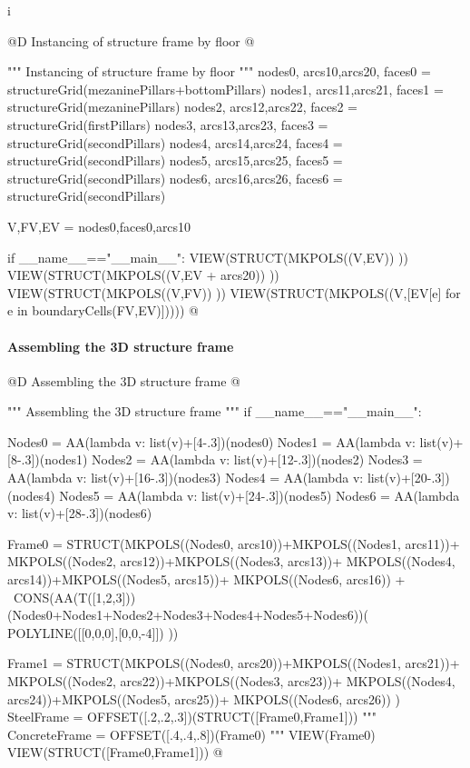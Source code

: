 i\documentclass[11pt,oneside]{article}    %
\begin{document}
@D Instancing of structure frame by floor 
@{""" Instancing of structure frame by floor """
nodes0, arcs10,arcs20, faces0 = structureGrid(mezaninePillars+bottomPillars)
nodes1, arcs11,arcs21, faces1 = structureGrid(mezaninePillars)
nodes2, arcs12,arcs22, faces2 = structureGrid(firstPillars)
nodes3, arcs13,arcs23, faces3 = structureGrid(secondPillars)
nodes4, arcs14,arcs24, faces4 = structureGrid(secondPillars)
nodes5, arcs15,arcs25, faces5 = structureGrid(secondPillars)
nodes6, arcs16,arcs26, faces6 = structureGrid(secondPillars)

V,FV,EV = nodes0,faces0,arcs10

if __name__=="__main__":
    VIEW(STRUCT(MKPOLS((V,EV)) ))
    VIEW(STRUCT(MKPOLS((V,EV + arcs20)) ))
    VIEW(STRUCT(MKPOLS((V,FV)) ))
    VIEW(STRUCT(MKPOLS((V,[EV[e] for e in boundaryCells(FV,EV)]))))
@}


\paragraph{Assembling the 3D structure frame}
@D Assembling the 3D structure frame 
@{""" Assembling the 3D structure frame """
if __name__=="__main__":

    Nodes0 = AA(lambda v: list(v)+[4-.3])(nodes0)
    Nodes1 = AA(lambda v: list(v)+[8-.3])(nodes1)
    Nodes2 = AA(lambda v: list(v)+[12-.3])(nodes2)
    Nodes3 = AA(lambda v: list(v)+[16-.3])(nodes3)
    Nodes4 = AA(lambda v: list(v)+[20-.3])(nodes4)
    Nodes5 = AA(lambda v: list(v)+[24-.3])(nodes5)
    Nodes6 = AA(lambda v: list(v)+[28-.3])(nodes6)
    
    Frame0 = STRUCT(MKPOLS((Nodes0, arcs10))+MKPOLS((Nodes1, arcs11))+
        MKPOLS((Nodes2, arcs12))+MKPOLS((Nodes3, arcs13))+
        MKPOLS((Nodes4, arcs14))+MKPOLS((Nodes5, arcs15))+
        MKPOLS((Nodes6, arcs16)) + \
        CONS(AA(T([1,2,3]))(Nodes0+Nodes1+Nodes2+Nodes3+Nodes4+Nodes5+Nodes6))(
        POLYLINE([[0,0,0],[0,0,-4]])  ))
    
    Frame1 = STRUCT(MKPOLS((Nodes0, arcs20))+MKPOLS((Nodes1, arcs21))+
        MKPOLS((Nodes2, arcs22))+MKPOLS((Nodes3, arcs23))+
        MKPOLS((Nodes4, arcs24))+MKPOLS((Nodes5, arcs25))+
        MKPOLS((Nodes6, arcs26)) )
    SteelFrame = OFFSET([.2,.2,.3])(STRUCT([Frame0,Frame1]))
    """
    ConcreteFrame = OFFSET([.4,.4,.8])(Frame0)
    """
    VIEW(Frame0)
    VIEW(STRUCT([Frame0,Frame1]))
@}
\end{document}

